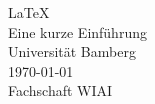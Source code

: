 \begin{center}
\Huge \LaTeX\\
\vspace{5mm} \LARGE Eine kurze Einführung\\
\vspace{12mm} \Large  Universität Bamberg\\[5mm]
\large \today\\
Fachschaft WIAI\normalsize \\
\end{center}
